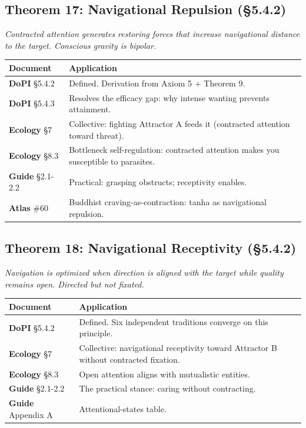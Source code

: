 \subsection*{Theorem 17: Navigational Repulsion (§5.4.2)}


\textit{Contracted attention generates restoring forces that increase navigational distance to the target. Conscious gravity is bipolar.}



\begin{longtable}{p{} p{}}
\toprule
\textbf{Document} & \textbf{Application} \\
\midrule
\endhead
\textbf{DoPI} §5.4.2 & Defined. Derivation from Axiom 5 + Theorem 9. \\
\textbf{DoPI} §5.4.3 & Resolves the efficacy gap: why intense wanting prevents attainment. \\
\textbf{Ecology} §7 & Collective: fighting Attractor A feeds it (contracted attention toward threat). \\
\textbf{Ecology} §8.3 & Bottleneck self-regulation: contracted attention makes you susceptible to parasites. \\
\textbf{Guide} §2.1-2.2 & Practical: grasping obstructs; receptivity enables. \\
\textbf{Atlas} \#60 & Buddhist craving-as-contraction: tanha as navigational repulsion. \\
\bottomrule
\end{longtable}



\subsection*{Theorem 18: Navigational Receptivity (§5.4.2)}


\textit{Navigation is optimized when direction is aligned with the target while quality remains open. Directed but not fixated.}



\begin{longtable}{p{} p{}}
\toprule
\textbf{Document} & \textbf{Application} \\
\midrule
\endhead
\textbf{DoPI} §5.4.2 & Defined. Six independent traditions converge on this principle. \\
\textbf{Ecology} §7 & Collective: navigational receptivity toward Attractor B without contracted fixation. \\
\textbf{Ecology} §8.3 & Open attention aligns with mutualistic entities. \\
\textbf{Guide} §2.1-2.2 & The practical stance: caring without contracting. \\
\textbf{Guide} Appendix A & Attentional-states table. \\
\bottomrule
\end{longtable}



